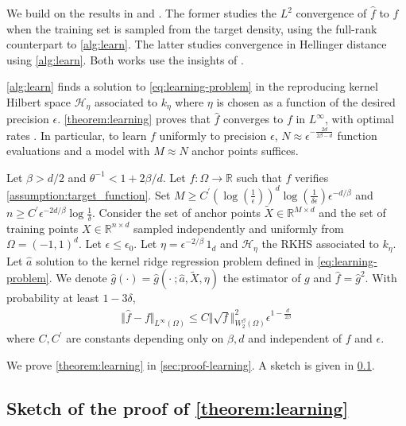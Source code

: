 We build on the results in \cite{ciliberto2021} and \cite{sampling-ulysse}. The former studies the $L^2$ convergence of $\hat f$ to $f$ when the training set is sampled from the target density, using the full-rank counterpart to \cref{alg:learn}. The latter studies convergence in Hellinger distance using \cref{alg:learn}. Both works use the insights of \cite{less-is-more}.

\cref{alg:learn} finds a solution to \cref{eq:learning-problem} in the reproducing kernel Hilbert space $\mathcal H_\eta$ associated to $k_\eta$ where $\eta$ is chosen as a function of the desired precision $\epsilon$. \cref{theorem:learning} proves that $\hat f$ converges to $f$ in $L^\infty$, with optimal rates \citep{wendland2004scattered}. In particular, to learn $f$ uniformly to precision $\epsilon$, $N\approx\epsilon^{-\frac{2d}{2\beta -d}}$ function evaluations and a model with $M \approx N$ anchor points suffices.

\begin{theorem}\label{theorem:learning}
Let $\beta > d/2$ and $\theta^{-1} < 1 + 2\beta/d$.  Let $f:\Omega \to \mathbb R$ such that $f$ verifies \cref{assumption:target_function}. Set $M \geq C^\prime (\log(\frac{1}{\epsilon}))^d\log(\frac{1}{\delta\epsilon})\epsilon^{-d/\beta}$ and $n \geq C^\prime \epsilon^{-2 d/\beta} \log \frac{1}{\delta}$. Consider the set of anchor points $\tilde X \in \mathbb R^{M \times d}$ and the set of training points $X \in \mathbb R^{n \times d}$ sampled independently and uniformly from $\Omega = (-1, 1)^d$. Let $\epsilon\leq \epsilon_0$. Let $\eta = \epsilon^{-2/\beta} \, 1_d$ and $\mathcal H_\eta$ the RKHS associated to $k_\eta$. Let $\hat a$ solution to the kernel ridge regression problem defined in \cref{eq:learning-problem}. We denote $\hat g(\cdot) = \hat g(\cdot ~; \hat a, \tilde X, \eta)$ the estimator of $g$ and $\hat f = \hat g^2$. With probability at least $1 - 3\delta$,
\begin{align}
    \Vert \hat f - f \Vert_{L^\infty(\Omega)}\leq C \Vert \sqrt{f}\Vert_{W^\beta_2(\Omega)}^2\epsilon^{1-\frac{d}{2\beta}}
\end{align}
where $C, C^\prime$ are constants depending only on $\beta, d$ and independent of $f$ and $\epsilon$.
\end{theorem}
We prove \cref{theorem:learning} in \cref{sec:proof-learning}. A sketch is given in \cref{sec:sketches-learning}.

\subsection{Sketch of the proof of \cref{theorem:learning}}\label{sec:sketches-learning}

